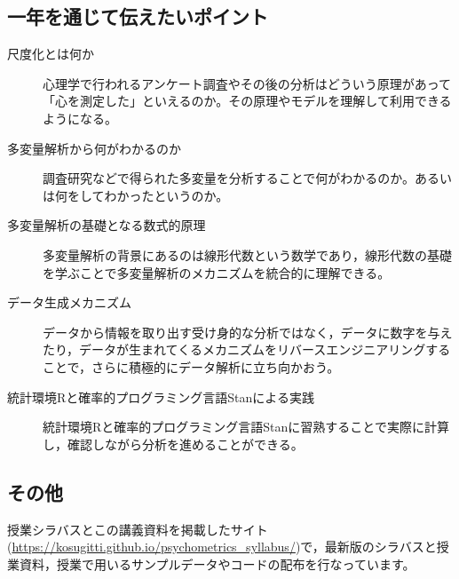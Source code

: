 \subsection*{一年を通じて伝えたいポイント}
\begin{description}
	\item[尺度化とは何か] 心理学で行われるアンケート調査やその後の分析はどういう原理があって「心を測定した」といえるのか。その原理やモデルを理解して利用できるようになる。
	\item[多変量解析から何がわかるのか] 調査研究などで得られた多変量を分析することで何がわかるのか。あるいは何をしてわかったというのか。
	\item[多変量解析の基礎となる数式的原理] 多変量解析の背景にあるのは線形代数という数学であり，線形代数の基礎を学ぶことで多変量解析のメカニズムを統合的に理解できる。
	\item[データ生成メカニズム] データから情報を取り出す受け身的な分析ではなく，データに数字を与えたり，データが生まれてくるメカニズムをリバースエンジニアリングすることで，さらに積極的にデータ解析に立ち向かおう。
	\item[統計環境Rと確率的プログラミング言語Stanによる実践] 統計環境Rと確率的プログラミング言語Stanに習熟することで実際に計算し，確認しながら分析を進めることができる。
\end{description}

\subsection*{その他}
授業シラバスとこの講義資料を掲載したサイト(\url{https://kosugitti.github.io/psychometrics_syllabus/})で，最新版のシラバスと授業資料，授業で用いるサンプルデータやコードの配布を行なっています。
